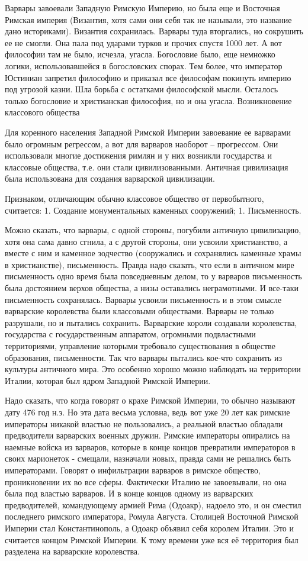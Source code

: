 Варвары завоевали Западную Римскую Империю, но была еще и Восточная Римская империя (Византия, хотя сами они себя так не называли, это название дано историками). Византия сохранилась. Варвары туда вторгались, но сокрушить ее не смогли. Она пала под ударами турков и прочих спустя 1000 лет. А вот философии там не было, исчезла, угасла. Богословие было, еще немножко логики, использовавшейся в богословских спорах. Тем более, что император Юстиниан запретил философию и приказал все философам покинуть империю под угрозой казни. Шла борьба с остатками философской мысли. Осталось только богословие и христианская философия, но и она угасла.
Возникновение классового общества

Для коренного населения Западной Римской Империи завоевание ее варварами было огромным регрессом, а вот для варваров наоборот – прогрессом. Они использовали многие достижения римлян и у них возникли государства и классовые общества, т.е. они стали цивилизованными. Античная цивилизация была использована для создания варварской цивилизации.

    Признаком, отличающим обычно классовое общество от первобытного, считается: 1. Создание монументальных каменных сооружений; 1. Письменность.

Можно сказать, что варвары, с одной стороны, погубили античную цивилизацию, хотя она сама давно сгнила, а с другой стороны, они усвоили христианство, а вместе с ним и каменное зодчество (сооружались и сохранялись каменные храмы в христианстве), письменность. Правда надо сказать, что если в античном мире письменность одно время была повседневным делом, то у варваров письменность была достоянием верхов общества, а низы оставались неграмотными. И все-таки письменность сохранялась. Варвары усвоили письменность и в этом смысле варварские королевства были классовыми обществами. Варвары не только разрушали, но и пытались сохранить. Варварские короли создавали королевства, государства с государственным аппаратом, огромными подвластными территориями, управление которыми требовало существования в обществе образования, письменности. Так что варвары пытались кое-что сохранить из культуры античного мира. Это особенно хорошо можно наблюдать на территории Италии, которая был ядром Западной Римской Империи.

Надо сказать, что когда говорят о крахе Римской Империи, то обычно называют дату 476 год н.э. Но эта дата весьма условна, ведь вот уже 20 лет как римские императоры никакой властью не пользовались, а реальной властью обладали предводители варварских военных дружин. Римские императоры опирались на наемные войска из варваров, которые в конце концов превратили императоров в своих марионеток - смещали, назначали новых, правда сами не решались быть императорами. Говорят о инфильтрации варваров в римское общество, проникновении их во все сферы. Фактически Италию не завоевывали, но она была под властью варваров. И в конце концов одному из варварских предводителей, командующему армией Рима (Одоакр), надоело это, и он сместил последнего римского императора, Ромула Августа. Столицей Восточной Римской Империи стал Константинополь, а Одоакр объявил себя королем Италии. Это и считается концом Римской Империи. К тому времени уже вся её территория был разделена на варварские королевства.

